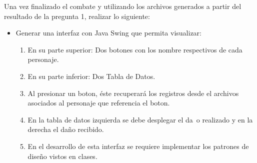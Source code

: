 \documentclass{exam}
\begin{document}
    		\item  Una vez finalizado el combate y utilizando los archivos generados a partir del resultado de la pregunta 1, realizar lo siguiente:
          \begin{itemize}
            \item Generar una interfaz con Java Swing que permita visualizar:
              \begin{enumerate}
                \item En su parte superior: Dos botones con los nombre respectivos de cada personaje.
                \item En su parte inferior: Dos Tabla de Datos.
                \item Al presionar un boton, \'este recuperar\'a los registros desde el archivos asociados al personaje que referencia el boton.
                \item En la tabla de datos izquierda se debe desplegar el da\n~o realizado y en la derecha el daño recibido.
                \item En el desarrollo de esta interfaz se requiere implementar los patrones de diseño vistos en clases.
              \end{enumerate}
          \end{itemize}
\end{document}
